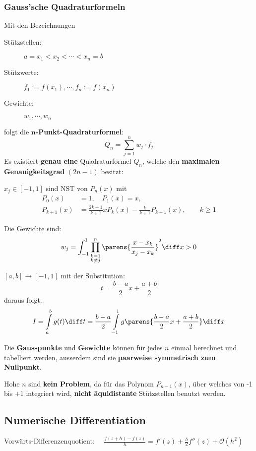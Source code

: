 		\subsubsection{Gauss'sche Quadraturformeln}
			Mit den Bezeichnungen
			\begin{description}
				\item[Stützstellen:] $a= x_1 < x_2 < \cdots < x_n = b$
				\item[Stützwerte:] $f_1:=f(x_1), \cdots , f_n := f(x_n)$
				\item[Gewichte:] $w_1, \cdots, w_n$
			\end{description}
			folgt die \textbf{$\mathbf{n}$-Punkt-Quadraturformel}:
			\[
				Q_n = \sum_{j=1}^n w_j\cdot f_j
			\]
			Es existiert \textbf{genau eine} Quadraturformel $Q_n$, welche den \textbf{maximalen Genauigkeitsgrad} $(2n-1)$ besitzt: 
			\begin{tightitemize}
				\item $x_j \in [-1,1]$ sind NST von $P_n(x)$ mit
					\begin{align*}
						P_0(x) &= 1, \quad P_1(x) = x, \\
						P_{k+1}(x) &= \frac{2k + 1}{k+1}xP_k(x) - \frac{k}{k+1}P_{k-1}(x), \qquad k\geq 1
					\end{align*}
				\item Die Gewichte sind:
					\[
						w_j = \int_{-1}^1 \prod_{\substack{
							k=1 \\ k \neq j
						}}^{n} \parens{ \frac{x-x_k}{x_j-x_k}}^2 \diff x> 0
					\]
				\item $[a,b] \to [-1,1]$ mit der Substitution:
					\[
						t= \frac{b-a}{2}x + \frac{a+b}{2}
					\]
					daraus folgt:
					\[
						I = \int\limits_a^b g(t) \diff t = \frac{b-a}{2}\int\limits_{-1}^1g \parens{ \frac{b-a}{2}x + \frac{a+b}{2}} \diff x
					\]
			\end{tightitemize}
			
			Die \textbf{Gausspunkte} und \textbf{Gewichte} können für jedes $n$ einmal berechnet und tabelliert werden, ausserdem sind sie \textbf{paarweise symmetrisch zum Nullpunkt}.

			Hohe $n$ sind \textbf{kein Problem}, da für das Polynom $P_{n-1}(x)$, über welches von -1 bis +1 integriert wird, \textbf{nicht äquidistante} Stützstellen benutzt werden.

	\subsection{Numerische Differentiation}
		\label{subsec:numerische_differentiation}
		Vorwärts-Differenzenquotient: $\quad \displaystyle \frac{f(z+h) - f(z)}{h}= f'(z) + \frac{h}{2}f''(z) + \mathcal{O}\left( h^2\right) $
		
